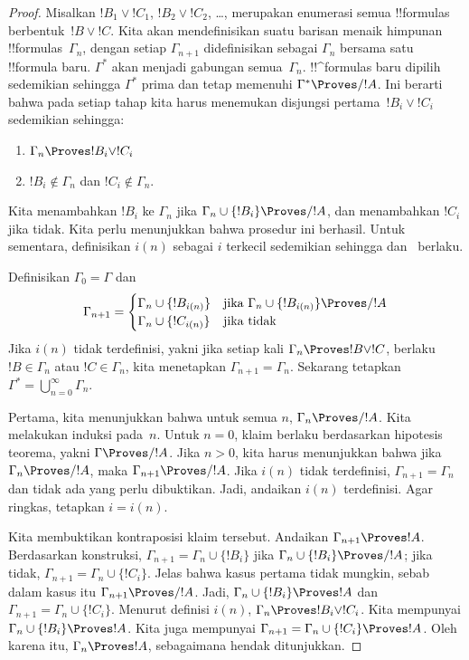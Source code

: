 \documentclass[../../../include/open-logic-section]{subfiles}
\begin{document}
\begin{proof}
  Misalkan $!B_1 \lor !C_1$, $!B_2 \lor !C_2$, \dots, merupakan enumerasi
  semua !!{formula}s berbentuk~$!B \lor !C$. Kita akan mendefinisikan suatu
  barisan menaik himpunan !!{formula}s~$\Gamma_n$, dengan setiap
  $\Gamma_{n+1}$ didefinisikan sebagai $\Gamma_n$ bersama satu !!{formula}
  baru. $\Gamma^*$ akan menjadi gabungan semua~$\Gamma_n$. !!^{formula}s
  baru dipilih sedemikian sehingga $\Gamma^*$ prima dan tetap memenuhi
  $\Gamma^* \Proves/ !A$. Ini berarti bahwa pada setiap tahap kita harus
  menemukan disjungsi pertama~$!B_i \lor !C_i$ sedemikian sehingga:
  \begin{enumerate}
  \item{} $\Gamma_n \Proves !B_i \lor !C_i$
  \item{} $!B_i \notin \Gamma_n$ dan
    $!C_i \notin \Gamma_n$.
  \end{enumerate}
  Kita menambahkan $!B_i$ ke $\Gamma_n$ jika
  $\Gamma_n \cup \{!B_i\} \Proves/ !A$, dan menambahkan $!C_i$ jika tidak.
  Kita perlu menunjukkan bahwa prosedur ini berhasil. Untuk sementara,
  definisikan $i(n)$ sebagai $i$ terkecil sedemikian sehingga
   dan~ berlaku.

  Definisikan $\Gamma_0 = \Gamma$ dan
  \[
  \Gamma_{n+1} = \begin{cases}
    \Gamma_n \cup \{!B_{i(n)}\} &
    \text{jika $\Gamma_n \cup \{!B_{i(n)}\} \Proves/ !A$} \\
    \Gamma_n \cup \{!C_{i(n)}\} & \text{jika tidak}
    \end{cases}
  \]
  Jika $i(n)$ tidak terdefinisi, yakni jika setiap kali
  $\Gamma_n \Proves !B \lor !C$, berlaku $!B \in \Gamma_n$ atau
  $!C \in \Gamma_n$, kita menetapkan $\Gamma_{n+1}=\Gamma_n$. Sekarang
  tetapkan $\Gamma^* = \bigcup_{n=0}^\infty \Gamma_n$.

  Pertama, kita menunjukkan bahwa untuk semua $n$,
  $\Gamma_n \Proves/ !A$. Kita melakukan induksi pada~$n$. Untuk $n=0$,
  klaim berlaku berdasarkan hipotesis teorema, yakni
  $\Gamma \Proves/ !A$. Jika $n>0$, kita harus menunjukkan bahwa jika
  $\Gamma_n \Proves/ !A$, maka $\Gamma_{n+1} \Proves/ !A$. Jika $i(n)$
  tidak terdefinisi, $\Gamma_{n+1}=\Gamma_n$ dan tidak ada yang perlu
  dibuktikan. Jadi, andaikan $i(n)$ terdefinisi. Agar ringkas, tetapkan
  $i=i(n)$.

  Kita membuktikan kontraposisi klaim tersebut. Andaikan
  $\Gamma_{n+1} \Proves !A$. Berdasarkan konstruksi,
  $\Gamma_{n+1}=\Gamma_n\cup\{!B_i\}$ jika
  $\Gamma_n\cup\{!B_i\}\Proves/ !A$; jika tidak,
  $\Gamma_{n+1}=\Gamma_n\cup\{!C_i\}$. Jelas bahwa kasus pertama tidak
  mungkin, sebab dalam kasus itu $\Gamma_{n+1}\Proves/ !A$. Jadi,
  $\Gamma_n\cup\{!B_i\}\Proves !A$ dan
  $\Gamma_{n+1}=\Gamma_n\cup\{!C_i\}$. Menurut definisi $i(n)$,
  $\Gamma_n\Proves !B_i\lor !C_i$. Kita mempunyai
  $\Gamma_n\cup\{!B_i\}\Proves !A$. Kita juga mempunyai
  $\Gamma_{n+1}=\Gamma_n\cup\{!C_i\}\Proves !A$. Oleh karena itu,
  $\Gamma_n\Proves !A$, sebagaimana hendak ditunjukkan.


\end{proof}
\end{document}
